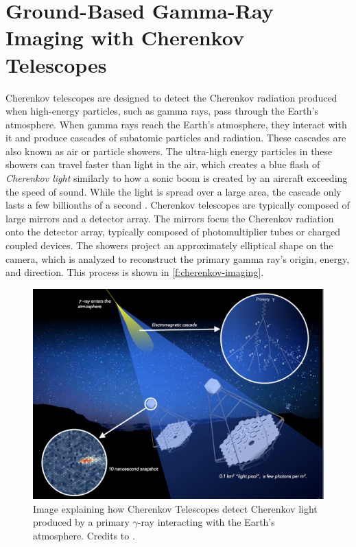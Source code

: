 \section{Ground-Based Gamma-Ray Imaging with Cherenkov Telescopes}
\label{s:iact}
Cherenkov telescopes are designed to detect the Cherenkov radiation produced when high-energy particles, such as gamma rays, pass through the Earth's atmosphere. 
When gamma rays reach the Earth's atmosphere, they interact with it and produce cascades of subatomic particles and radiation. These cascades are also known as air or particle showers. The ultra-high energy particles in these showers can travel faster than light in the air, which creates a blue flash of \textit{Cherenkov light} similarly to how a sonic boom is created by an aircraft exceeding the speed of sound. While the light is spread over a large area, the cascade only lasts a few billionths of a second \cite{ong2009gamma}.  Cherenkov telescopes are typically composed of large mirrors and a detector array. The mirrors focus the Cherenkov radiation onto the detector array, typically composed of photomultiplier tubes or charged coupled devices. The showers project an approximately elliptical shape on the camera, which is analyzed to reconstruct the primary gamma ray's origin, energy, and direction. This process is shown in \autoref{f:cherenkov-imaging}.
\begin{figure}[ht] 
\centering
\includegraphics[width=1\textwidth]{figures/introduction/cherenkov-imaging.png}
\caption{Image explaining how Cherenkov Telescopes detect Cherenkov light produced by a primary $\gamma$-ray interacting with the Earth’s atmosphere. Credits to \cite{ctaobservatorywebsite}.}
\label{f:cherenkov-imaging}
\end{figure}
